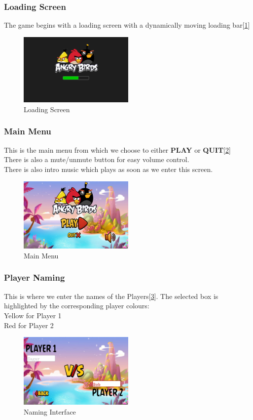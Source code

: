 \documentclass{article}
\begin{document}
\subsubsection{Loading Screen}
The game begins with a loading screen with a dynamically moving loading bar[\ref{fig:Load}]
\begin{figure}[h]
    \centering
    \includegraphics[width=0.5\textwidth]{Loading.png}
    \caption{Loading Screen}\label{fig:Load}
\end{figure}
\newpage
\subsubsection{Main Menu}
This is the main menu from which we choose to either \textbf{PLAY} or \textbf{QUIT}[\ref{fig:Menu}]\\There is also a mute/unmute button for easy volume control.
\\There is also intro music which plays as soon as we enter this screen.
\begin{figure}[h]
    \centering
    \includegraphics[width=0.5\textwidth]{Menu.png}
    \caption{Main Menu}\label{fig:Menu}
\end{figure}

\subsubsection{Player Naming}
This is where we enter the names of the Players[\ref{fig:Name}]. The selected box is highlighted by the corresponding player colours:\\Yellow for Player 1\\Red for Player 2
\begin{figure}[h]
    \centering
    \includegraphics[width=0.5\textwidth]{Naming.png}
    \caption{Naming Interface}\label{fig:Name}
\end{figure}
\newpage
\end{document}
